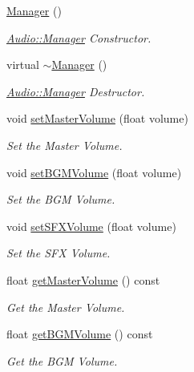 \begin{DoxyCompactItemize}
\item 
\hyperlink{class_magnum_1_1_audio_1_1_manager_a016364645e15396221faf0f7bb2e2607}{Manager} ()
\begin{DoxyCompactList}\small\item\em \hyperlink{class_magnum_1_1_audio_1_1_manager}{Audio\+::\+Manager} Constructor. \end{DoxyCompactList}\item 
virtual \hyperlink{class_magnum_1_1_audio_1_1_manager_a93f306edbf9dcfc8ff98cd44ec66a903}{$\sim$\+Manager} ()
\begin{DoxyCompactList}\small\item\em \hyperlink{class_magnum_1_1_audio_1_1_manager}{Audio\+::\+Manager} Destructor. \end{DoxyCompactList}\item 
void \hyperlink{class_magnum_1_1_audio_1_1_manager_ac7ef14547cf4853a7878f30b98482181}{set\+Master\+Volume} (float volume)
\begin{DoxyCompactList}\small\item\em Set the Master Volume. \end{DoxyCompactList}\item 
void \hyperlink{class_magnum_1_1_audio_1_1_manager_a0e3cd85c6b28a25a550664ef1b038b0a}{set\+B\+G\+M\+Volume} (float volume)
\begin{DoxyCompactList}\small\item\em Set the B\+GM Volume. \end{DoxyCompactList}\item 
void \hyperlink{class_magnum_1_1_audio_1_1_manager_a6043ba6ba2844915c60b237c7e0b7e9a}{set\+S\+F\+X\+Volume} (float volume)
\begin{DoxyCompactList}\small\item\em Set the S\+FX Volume. \end{DoxyCompactList}\item 
float \hyperlink{class_magnum_1_1_audio_1_1_manager_a7c7b1a218649a82da9384e89c2bbc704}{get\+Master\+Volume} () const 
\begin{DoxyCompactList}\small\item\em Get the Master Volume. \end{DoxyCompactList}\item 
float \hyperlink{class_magnum_1_1_audio_1_1_manager_aaf96945a324146455bda66853533ea56}{get\+B\+G\+M\+Volume} () const 
\begin{DoxyCompactList}\small\item\em Get the B\+GM Volume. \end{DoxyCompactList}\item 

\end{DoxyCompactItemize}
